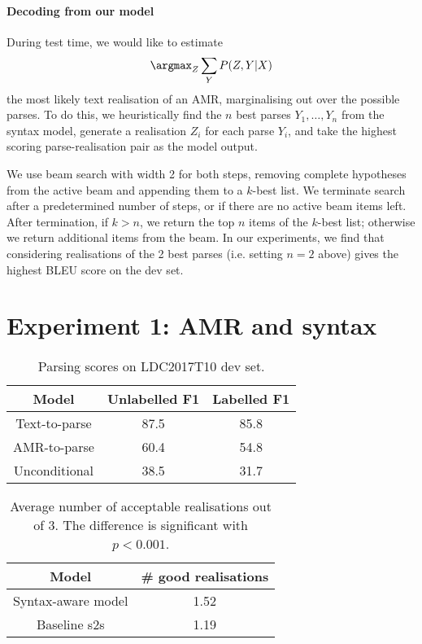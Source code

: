 \paragraph{Decoding from our model}
During test time, we would like to estimate 
\begin{equation}
    \argmax_{Z} \sum_Y P(Z, Y | X)
    \label{sec:decoding}
\end{equation}
the most likely text realisation of an AMR, marginalising out over the possible parses. To do this, we heuristically find the $n$ best parses $Y_1, \dots, Y_n$ from the syntax model, generate a realisation $Z_i$ for each parse $Y_i$, and take the highest scoring parse-realisation pair as the model output.

We use beam search with width 2 for both steps, removing complete hypotheses from the active beam and appending them to a $k$-best list. We terminate search after a predetermined number of steps, or if there are no active beam items left. After termination, if $k > n$, we return the top $n$ items of the $k$-best list; otherwise we return additional items from the beam. In our experiments, we find that considering realisations of the 2 best parses (i.e. setting $n = 2$ above) gives the highest BLEU score on the dev set.

\section{Experiment 1: AMR and syntax}
\label{sec:parsing}
\begin{table}[t]
    \centering
    \begin{tabular}{ccc}
        \toprule
        Model &  Unlabelled F1 & Labelled F1\\
        \midrule
        Text-to-parse & 87.5 & 85.8 \\
        AMR-to-parse & 60.4 & 54.8 \\
        Unconditional & 38.5 & 31.7 \\
        \bottomrule
    \end{tabular}
    \caption{Parsing scores on LDC2017T10 dev set.}
    \label{tab:parsing}
\end{table}

\begin{table}[t]
    \centering
    \begin{tabular}{cc}
        \toprule
        Model & \# good realisations \\
        \midrule
        Syntax-aware model & 1.52 \\
        Baseline s2s & 1.19 \\
        \bottomrule
    \end{tabular}
    \caption{Average number of acceptable realisations out of 3. The difference is significant with $p< 0.001$.}
    \label{tab:paraphrase}
    \vspace{-1em}
\end{table}


